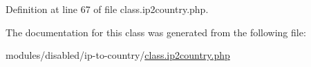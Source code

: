 Definition at line 67 of file class.\-ip2country.\-php.




The documentation for this class was generated from the following file\-:\begin{DoxyCompactItemize}
\item 
modules/disabled/ip-\/to-\/country/\hyperlink{class_8ip2country_8php}{class.\-ip2country.\-php}\end{DoxyCompactItemize}
